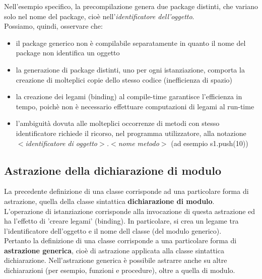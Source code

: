 \documentclass{article}
\begin{document}
	Nell'esempio specifico, la precompilazione genera due package distinti, che variano solo nel nome del package, cioè nell'\textit{identificatore dell'oggetto}.
	\vspace{\baselineskip} \\
	Possiamo, quindi, osservare che:
	\begin{itemize}
		\item il package generico non è compilabile separatamente in quanto il nome del package non identifica un oggetto
		\item la generazione di package distinti, uno per ogni istanziazione, comporta la creazione di molteplici copie dello stesso codice (inefficienza di spazio)
		\item la creazione dei legami (binding) al compile-time garantisce l'efficienza in tempo, poichè non è necessario effettuare computazioni di legami al run-time
		\item l'ambiguità dovuta alle molteplici occorrenze di metodi con stesso identificatore richiede il ricorso, nel programma utilizzatore, alla notazione \textit{$<$identificatore di oggetto$>$.$<$nome metodo$>$} (ad esempio s1.push(10))
	\end{itemize}

	\subsection{Astrazione della dichiarazione di modulo}
	La precedente definizione di una classe corrisponde ad una particolare forma di astrazione, quella della classe sintattica \textbf{dichiarazione di modulo}.\\
	L'operazione di istanziazione corrisponde alla invocazione di questa astrazione ed ha l'effetto di 'creare legami' (binding). In particolare, si crea un legame tra l'identificatore dell'oggetto e il nome dell classe (del modulo generico).\\
	Pertanto la definizione di una classe corrisponde a una particolare forma di \textbf{astrazione generica}, cioè di astrazione applicata alla classe sintattica dichiarazione. Nell'astrazione generica è possibile astrarre anche su altre dichiarazioni (per esempio, funzioni e procedure), oltre a quella di modulo.
\end{document}

